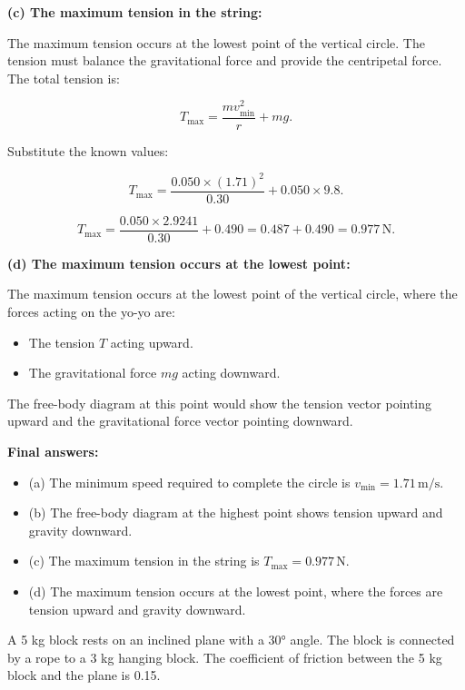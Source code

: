 \documentclass[addpoints]{exam}
\begin{document}
\begin{questions}
\begin{solution}[5cm]
\textbf{(c) The maximum tension in the string:}

The maximum tension occurs at the lowest point of the vertical circle. The tension must balance the gravitational force and provide the centripetal force. The total tension is:

\[
T_{\text{max}} = \frac{m v_{\text{min}}^2}{r} + m g.
\]

Substitute the known values:

\[
T_{\text{max}} = \frac{0.050 \times (1.71)^2}{0.30} + 0.050 \times 9.8.
\]

\[
T_{\text{max}} = \frac{0.050 \times 2.9241}{0.30} + 0.490 = 0.487 + 0.490 = 0.977 \, \text{N}.
\]

\textbf{(d) The maximum tension occurs at the lowest point:}

The maximum tension occurs at the lowest point of the vertical circle, where the forces acting on the yo-yo are:
\begin{itemize}
    \item The tension \( T \) acting upward.
    \item The gravitational force \( mg \) acting downward.
\end{itemize}
The free-body diagram at this point would show the tension vector pointing upward and the gravitational force vector pointing downward.

\textbf{Final answers:}
\begin{itemize}
    \item (a) The minimum speed required to complete the circle is \( v_{\text{min}} = 1.71 \, \text{m/s} \).
    \item (b) The free-body diagram at the highest point shows tension upward and gravity downward.
    \item (c) The maximum tension in the string is \( T_{\text{max}} = 0.977 \, \text{N} \).
    \item (d) The maximum tension occurs at the lowest point, where the forces are tension upward and gravity downward.
\end{itemize}
\end{solution}



\question A 5 kg block rests on an inclined plane with a 30° angle. The block is connected by a rope to a 3 kg hanging block. The coefficient of friction between the 5 kg block and the plane is 0.15.
\end{questions}
\end{document}
